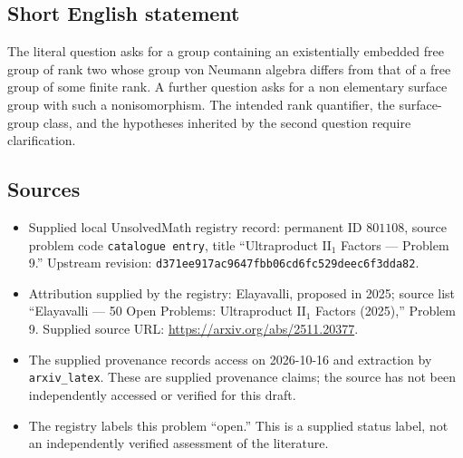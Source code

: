 \documentclass[11pt]{article}
\begin{document}
\subsection{Short English statement}
The literal question asks for a group containing an existentially embedded free group of rank two whose group von Neumann algebra differs from that of a free group of some finite rank. A further question asks for a non elementary surface group with such a nonisomorphism. The intended rank quantifier, the surface-group class, and the hypotheses inherited by the second question require clarification.
\subsection{Sources}
\begin{itemize}
\item Supplied local UnsolvedMath registry record: permanent ID \(801108\), source problem code \texttt{catalogue entry}, title ``Ultraproduct \(\mathrm{II}_1\) Factors --- Problem 9.'' Upstream revision: \texttt{d371ee917ac9647fbb06cd6fc529deec6f3dda82}.
\item Attribution supplied by the registry: Elayavalli, proposed in 2025; source list ``Elayavalli --- 50 Open Problems: Ultraproduct \(\mathrm{II}_1\) Factors (2025),'' Problem 9. Supplied source URL: \url{https://arxiv.org/abs/2511.20377}.
\item The supplied provenance records access on 2026-10-16 and extraction by \texttt{arxiv\_latex}. These are supplied provenance claims; the source has not been independently accessed or verified for this draft.
\item The registry labels this problem ``open.'' This is a supplied status label, not an independently verified assessment of the literature.
\end{itemize}
\end{document}
